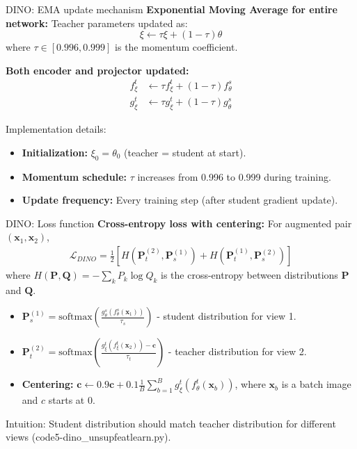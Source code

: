 \documentclass{beamer}
\begin{document}
\begin{frame}{DINO: EMA update mechanism}
\textbf{Exponential Moving Average for entire network:}
Teacher parameters updated as:
$$\xi \leftarrow \tau \xi + (1 - \tau) \theta$$
where $\tau \in [0.996, 0.999]$ is the momentum coefficient.

\vspace{0.3cm}

\textbf{Both encoder and projector updated:}
\begin{align*}
f_\xi^t &\leftarrow \tau f_\xi^t + (1-\tau) f_\theta^s \\
g_\xi^t &\leftarrow \tau g_\xi^t + (1-\tau) g_\theta^s
\end{align*}

\vspace{0.3cm}

Implementation details:
\begin{itemize}
\item \textbf{Initialization:} $\xi_0 = \theta_0$ (teacher = student at start).
\vspace{0.3cm}
\item \textbf{Momentum schedule:} $\tau$ increases from 0.996 to 0.999 during training.
\vspace{0.3cm}
\item \textbf{Update frequency:} Every training step (after student gradient update).
\end{itemize}
\end{frame}

\begin{frame}{DINO: Loss function}
\textbf{Cross-entropy loss with centering:}
For augmented pair $(\mathbf{x}_1, \mathbf{x}_2)$,
\begin{align*}
\mathcal{L}_{DINO} = \frac{1}{2}\left[H(\mathbf{P}_t^{(2)}, \mathbf{P}_s^{(1)}) + H(\mathbf{P}_t^{(1)}, \mathbf{P}_s^{(2)})\right]
\end{align*}
  \vspace{0.3cm}
where $H(\mathbf{P}, \mathbf{Q}) = -\sum_k P_k \log Q_k$ is the cross-entropy between distributions $\mathbf{P}$ and $\mathbf{Q}$.
  \vspace{0.3cm}
\begin{itemize}
\item $\mathbf{P}_s^{(1)} = \text{softmax}\left(\frac{g_\theta^s(f_\theta^s(\mathbf{x}_1))}{\tau_s}\right)$ - student distribution for view 1.
  \vspace{0.3cm}
\item $\mathbf{P}_t^{(2)} = \text{softmax}\left(\frac{g_\xi^t(f_\xi^t(\mathbf{x}_2)) - \mathbf{c}}{\tau_t}\right)$ - teacher distribution for view 2.
  \vspace{0.3cm}
\item \textbf{Centering:} $\mathbf{c} \leftarrow 0.9 \mathbf{c} + 0.1 \frac{1}{B}\sum_{b=1}^B g_\xi^t(f_\theta^t(\mathbf{x}_b))$, where $\mathbf{x}_b$ is a batch image and $c$ starts at $0$. 
\end{itemize}

\alert{Intuition: Student distribution should match teacher distribution for different views (code5-dino\_unsupfeatlearn.py).}

\end{frame}
\end{document}
